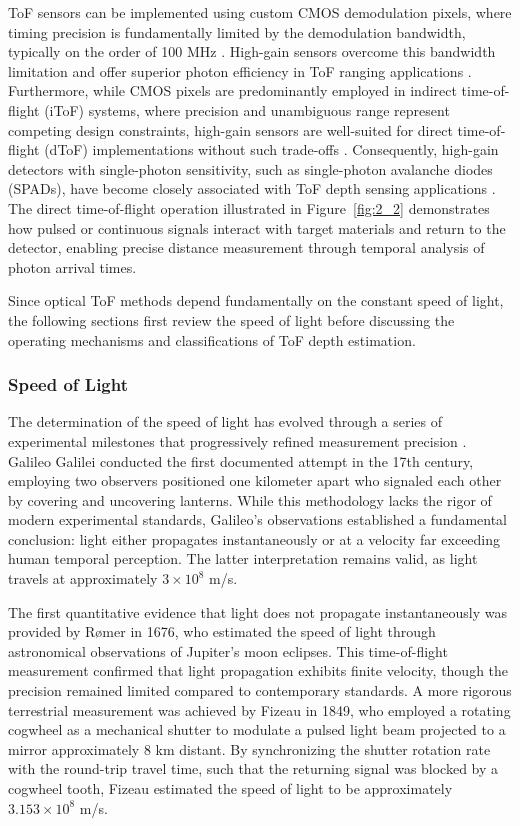 \documentclass[12pt,a4paper,oneside]{report}
\begin{document}
ToF sensors can be implemented using custom CMOS demodulation pixels, where timing precision is fundamentally limited by the demodulation bandwidth, typically on the order of 100 MHz \cite{bamji2022}. High-gain sensors overcome this bandwidth limitation and offer superior photon efficiency in ToF ranging applications \cite{piron2020}. Furthermore, while CMOS pixels are predominantly employed in indirect time-of-flight (iToF) systems, where precision and unambiguous range represent competing design constraints, high-gain sensors are well-suited for direct time-of-flight (dToF) implementations without such trade-offs \cite{bamji2022}. Consequently, high-gain detectors with single-photon sensitivity, such as single-photon avalanche diodes (SPADs), have become closely associated with ToF depth sensing applications \cite{piron2020}. The direct time-of-flight operation illustrated in Figure~\ref{fig:2_2} demonstrates how pulsed or continuous signals interact with target materials and return to the detector, enabling precise distance measurement through temporal analysis of photon arrival times.

Since optical ToF methods depend fundamentally on the constant speed of light, the following sections first review the speed of light before discussing the operating mechanisms and classifications of ToF depth estimation.

\subsubsection{Speed of Light}
\label{subsubsec:speed_of_light}

The determination of the speed of light has evolved through a series of experimental milestones that progressively refined measurement precision \cite{wikipedia2019}. Galileo Galilei conducted the first documented attempt in the 17th century, employing two observers positioned one kilometer apart who signaled each other by covering and uncovering lanterns. While this methodology lacks the rigor of modern experimental standards, Galileo's observations established a fundamental conclusion: light either propagates instantaneously or at a velocity far exceeding human temporal perception. The latter interpretation remains valid, as light travels at approximately $3 \times 10^8$ m/s.

The first quantitative evidence that light does not propagate instantaneously was provided by Rømer in 1676, who estimated the speed of light through astronomical observations of Jupiter's moon eclipses. This time-of-flight measurement confirmed that light propagation exhibits finite velocity, though the precision remained limited compared to contemporary standards. A more rigorous terrestrial measurement was achieved by Fizeau in 1849, who employed a rotating cogwheel as a mechanical shutter to modulate a pulsed light beam projected to a mirror approximately 8 km distant. By synchronizing the shutter rotation rate with the round-trip travel time, such that the returning signal was blocked by a cogwheel tooth, Fizeau estimated the speed of light to be approximately $3.153 \times 10^8$ m/s.
\end{document}
